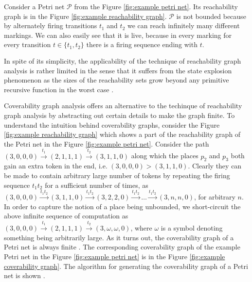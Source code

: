 \begin{example}
  Consider a Petri net $\mathcal P$ from the Figure \ref{fig:example petri net}. Its reachability graph is in the Figure \ref{fig:example reachability graph}. $\mathcal P$ is not bounded because by alternately firing transitions $t_1$ and $t_2$ we can reach infinitely many different markings. We can also easily see that it is live, because in every marking for every transition $t\in\{t_1, t_2\}$ there is a firing sequence ending with $t$.
\end{example}

In spite of its simplicity, the applicability of the technique of reachability graph analysis is rather limited in the sense that it suffers from the state explosion phenomenon as the sizes of the reachability sets grow beyond any primitive recursive function in the worst case \cite{Yen06PetriNets}.

Coverability graph analysis offers an alternative to the techinque of reachability graph analysis by abstracting out certain details to make the graph finite. To understand the intuition behind coverability graphs, consider the Figure \ref{fig:example reachability graph} which shows a part of the reachability graph of the Petri net in the Figure \ref{fig:example petri net}. Consider the path $(3,0,0,0)\xrightarrow{t_1}(2,1,1,1)\xrightarrow{t_2}(3,1,1,0)$ along which the places $p_2$ and $p_3$ both gain an extra token in the end, i.e. $(3,0,0,0) > (3,1,1,0)$. Clearly they can be made to contain arbitrary large number of tokens by repeating the firing sequence $t_1t_2$ for a sufficient number of times, as $(3,0,0,0)\xrightarrow{t_1t_2}(3,1,1,0)\xrightarrow{t_1t_2}(3,2,2,0)\xrightarrow{t_1t_2}\ldots\xrightarrow{t_1t_2}(3,n,n,0)$, for arbitrary $n$. In order to capture the notion of a place being unbounded, we short-circuit the above infinite sequence of computation as $(3,0,0,0)\xrightarrow{t_1}(2,1,1,1)\xrightarrow{t_2}(3,\omega,\omega,0)$, where $\omega$ is a symbol denoting something being arbitrarily large. As it turns out, the coverability graph of a Petri net is always finite \cite{Karp69ParallelProgramSchemata}. The corresponding coverability graph of the example Petri net in the Figure \ref{fig:example petri net} is in the Figure \ref{fig:example coverability graph}. The algorithm for generating the coverability graph of a Petri net is shown .

